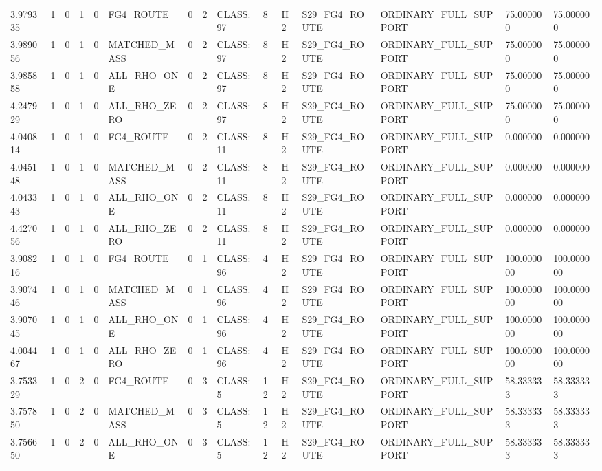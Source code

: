 \begin{tabular}{lllllllllllllll}
3.979335 & 1 & 0 & 1 & 0 & FG4\_ROUTE & 0 & 2 & CLASS:97 & 8 & H2 & S29\_FG4\_ROUTE & ORDINARY\_FULL\_SUPPORT & 75.000000 & 75.000000 \\
3.989056 & 1 & 0 & 1 & 0 & MATCHED\_MASS & 0 & 2 & CLASS:97 & 8 & H2 & S29\_FG4\_ROUTE & ORDINARY\_FULL\_SUPPORT & 75.000000 & 75.000000 \\
3.985858 & 1 & 0 & 1 & 0 & ALL\_RHO\_ONE & 0 & 2 & CLASS:97 & 8 & H2 & S29\_FG4\_ROUTE & ORDINARY\_FULL\_SUPPORT & 75.000000 & 75.000000 \\
4.247929 & 1 & 0 & 1 & 0 & ALL\_RHO\_ZERO & 0 & 2 & CLASS:97 & 8 & H2 & S29\_FG4\_ROUTE & ORDINARY\_FULL\_SUPPORT & 75.000000 & 75.000000 \\
4.040814 & 1 & 0 & 1 & 0 & FG4\_ROUTE & 0 & 2 & CLASS:11 & 8 & H2 & S29\_FG4\_ROUTE & ORDINARY\_FULL\_SUPPORT & 0.000000 & 0.000000 \\
4.045148 & 1 & 0 & 1 & 0 & MATCHED\_MASS & 0 & 2 & CLASS:11 & 8 & H2 & S29\_FG4\_ROUTE & ORDINARY\_FULL\_SUPPORT & 0.000000 & 0.000000 \\
4.043343 & 1 & 0 & 1 & 0 & ALL\_RHO\_ONE & 0 & 2 & CLASS:11 & 8 & H2 & S29\_FG4\_ROUTE & ORDINARY\_FULL\_SUPPORT & 0.000000 & 0.000000 \\
4.427056 & 1 & 0 & 1 & 0 & ALL\_RHO\_ZERO & 0 & 2 & CLASS:11 & 8 & H2 & S29\_FG4\_ROUTE & ORDINARY\_FULL\_SUPPORT & 0.000000 & 0.000000 \\
3.908216 & 1 & 0 & 1 & 0 & FG4\_ROUTE & 0 & 1 & CLASS:96 & 4 & H2 & S29\_FG4\_ROUTE & ORDINARY\_FULL\_SUPPORT & 100.000000 & 100.000000 \\
3.907446 & 1 & 0 & 1 & 0 & MATCHED\_MASS & 0 & 1 & CLASS:96 & 4 & H2 & S29\_FG4\_ROUTE & ORDINARY\_FULL\_SUPPORT & 100.000000 & 100.000000 \\
3.907045 & 1 & 0 & 1 & 0 & ALL\_RHO\_ONE & 0 & 1 & CLASS:96 & 4 & H2 & S29\_FG4\_ROUTE & ORDINARY\_FULL\_SUPPORT & 100.000000 & 100.000000 \\
4.004467 & 1 & 0 & 1 & 0 & ALL\_RHO\_ZERO & 0 & 1 & CLASS:96 & 4 & H2 & S29\_FG4\_ROUTE & ORDINARY\_FULL\_SUPPORT & 100.000000 & 100.000000 \\
3.753329 & 1 & 0 & 2 & 0 & FG4\_ROUTE & 0 & 3 & CLASS:5 & 12 & H2 & S29\_FG4\_ROUTE & ORDINARY\_FULL\_SUPPORT & 58.333333 & 58.333333 \\
3.757850 & 1 & 0 & 2 & 0 & MATCHED\_MASS & 0 & 3 & CLASS:5 & 12 & H2 & S29\_FG4\_ROUTE & ORDINARY\_FULL\_SUPPORT & 58.333333 & 58.333333 \\
3.756650 & 1 & 0 & 2 & 0 & ALL\_RHO\_ONE & 0 & 3 & CLASS:5 & 12 & H2 & S29\_FG4\_ROUTE & ORDINARY\_FULL\_SUPPORT & 58.333333 & 58.333333 \\

\end{tabular}
